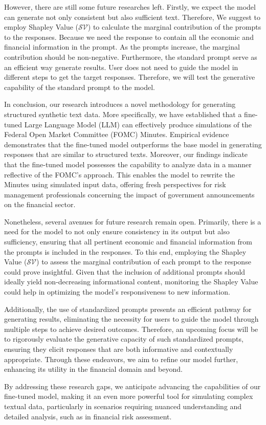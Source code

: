 However, there are still some future researches left. Firstly, we expect the model can generate not only consistent but also sufficient text. Therefore, We suggest to employ Shapley Value ($\mathcal{SV}$) to calculate the marginal contribution of the prompts to the responses. Because we need the response to contain all the economic and financial information in the prompt. As the prompts increase, the marginal contribution should be non-negative. Furthermore, the standard prompt serve as an efficient way generate results. User does not need to guide the model in different steps to get the target responses. Therefore, we will test the generative capability of the standard prompt to the model. 

In conclusion, our research introduces a novel methodology for generating structured synthetic text data. More specifically, we have established that a fine-tuned Large Language Model (LLM) can effectively produce simulations of the Federal Open Market Committee (FOMC) Minutes. Empirical evidence demonstrates that the fine-tuned model outperforms the base model in generating responses that are similar to structured texts. Moreover, our findings indicate that the fine-tuned model possesses the capability to analyze data in a manner reflective of the FOMC's approach. This enables the model to rewrite the Minutes using simulated input data, offering fresh perspectives for risk management professionals concerning the impact of government announcements on the financial sector.

Nonetheless, several avenues for future research remain open. Primarily, there is a need for the model to not only ensure consistency in its output but also sufficiency, ensuring that all pertinent economic and financial information from the prompts is included in the responses. To this end, employing the Shapley Value ($\mathcal{SV}$) to assess the marginal contribution of each prompt to the response could prove insightful. Given that the inclusion of additional prompts should ideally yield non-decreasing informational content, monitoring the Shapley Value could help in optimizing the model's responsiveness to new information.

Additionally, the use of standardized prompts presents an efficient pathway for generating results, eliminating the necessity for users to guide the model through multiple steps to achieve desired outcomes. Therefore, an upcoming focus will be to rigorously evaluate the generative capacity of such standardized prompts, ensuring they elicit responses that are both informative and contextually appropriate. Through these endeavors, we aim to refine our model further, enhancing its utility in the financial domain and beyond.

By addressing these research gaps, we anticipate advancing the capabilities of our fine-tuned model, making it an even more powerful tool for simulating complex textual data, particularly in scenarios requiring nuanced understanding and detailed analysis, such as in financial risk assessment.







